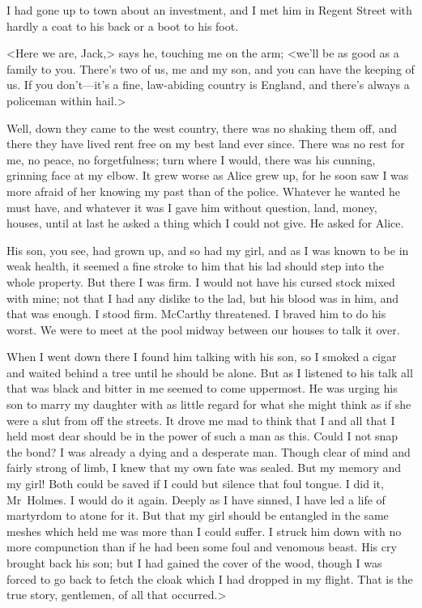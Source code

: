 I had gone up to town about an investment, and I met him in Regent Street with hardly a coat to his back or a boot to his foot.

<Here we are, Jack,> says he, touching me on the arm; <we'll be as good as a family to you. There's two of us, me and my son, and you can have the keeping of us. If you don't—it's a fine, law-abiding country is England, and there's always a policeman within hail.>

Well, down they came to the west country, there was no shaking them off, and there they have lived rent free on my best land ever since. There was no rest for me, no peace, no forgetfulness; turn where I would, there was his cunning, grinning face at my elbow. It grew worse as Alice grew up, for he soon saw I was more afraid of her knowing my past than of the police. Whatever he wanted he must have, and whatever it was I gave him without question, land, money, houses, until at last he asked a thing which I could not give. He asked for Alice.

His son, you see, had grown up, and so had my girl, and as I was known to be in weak health, it seemed a fine stroke to him that his lad should step into the whole property. But there I was firm. I would not have his cursed stock mixed with mine; not that I had any dislike to the lad, but his blood was in him, and that was enough. I stood firm. McCarthy threatened. I braved him to do his worst. We were to meet at the pool midway between our houses to talk it over.

When I went down there I found him talking with his son, so I smoked a cigar and waited behind a tree until he should be alone. But as I listened to his talk all that was black and bitter in me seemed to come uppermost. He was urging his son to marry my daughter with as little regard for what she might think as if she were a slut from off the streets. It drove me mad to think that I and all that I held most dear should be in the power of such a man as this. Could I not snap the bond? I was already a dying and a desperate man. Though clear of mind and fairly strong of limb, I knew that my own fate was sealed. But my memory and my girl! Both could be saved if I could but silence that foul tongue. I did it, Mr~Holmes. I would do it again. Deeply as I have sinned, I have led a life of martyrdom to atone for it. But that my girl should be entangled in the same meshes which held me was more than I could suffer. I struck him down with no more compunction than if he had been some foul and venomous beast. His cry brought back his son; but I had gained the cover of the wood, though I was forced to go back to fetch the cloak which I had dropped in my flight. That is the true story, gentlemen, of all that occurred.>

